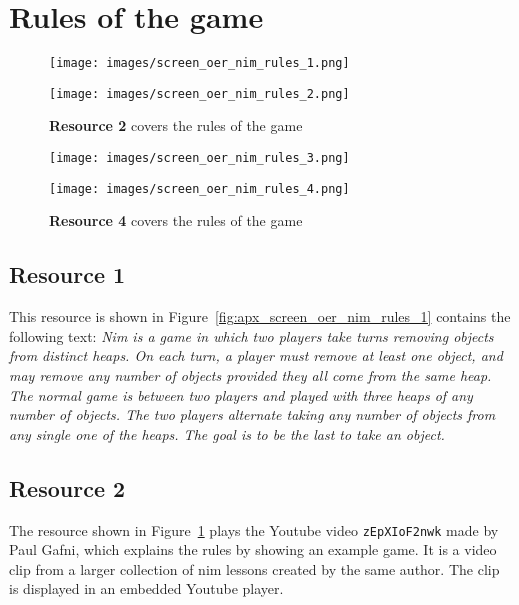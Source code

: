 \section{Rules of the game}
\begin{figure}[ht!]
\begin{minipage}{0.5\linewidth}
	\centering
	\texttt{[image: images/screen\_oer\_nim\_rules\_1.png]}
	\caption[Resource 1]{\textbf{Resource 1} covers the rules of the game}
	\label{fig:apx_screen_oer_nim_rules_1}
\end{minipage}
\hspace{0.1\linewidth}
\begin{minipage}{0.4\linewidth}
	\centering
	\texttt{[image: images/screen\_oer\_nim\_rules\_2.png]}
	\caption[Resource 2]{\textbf{Resource 2} covers the rules of the game}
	\label{fig:apx_screen_oer_nim_rules_2}
\end{minipage}
\end{figure}
\begin{figure}[ht!]
\begin{minipage}{0.5\linewidth}
	\centering
	\texttt{[image: images/screen\_oer\_nim\_rules\_3.png]}
	\caption[Resource 3]{\textbf{Resource 3} covers the rules of the game}
	\label{fig:apx_screen_oer_nim_rules_3}
\end{minipage}
\hspace{0.1\linewidth}
\begin{minipage}{0.4\linewidth}
	\centering
	\texttt{[image: images/screen\_oer\_nim\_rules\_4.png]}
	\caption[Resource 4]{\textbf{Resource 4} covers the rules of the game}
	\label{fig:apx_screen_oer_nim_rules_4}
\end{minipage}
\end{figure}
\subsection{Resource 1}
This resource is shown in Figure~\ref{fig:apx_screen_oer_nim_rules_1} contains the following text: \emph{Nim is a game in which two players take turns removing
objects from distinct heaps. On each turn, a player must remove at least
one object, and may remove any number of objects provided they all come
from the same heap. The normal game is between two players and played with
three heaps of any number of objects. The two players alternate taking any number
of objects from any single one of the heaps. The goal is to be the last to take an
object.}
\subsection{Resource 2}
The resource shown in Figure~\ref{fig:apx_screen_oer_nim_rules_2} plays the
Youtube video \texttt{zEpXIoF2nwk} made by Paul Gafni, which explains the rules
by showing an example game. It is a video clip from a larger
collection of nim lessons created by the same author. The clip is displayed in
an embedded Youtube player.
